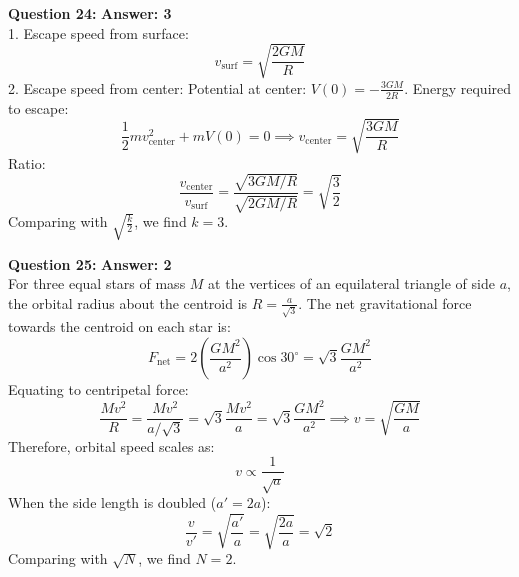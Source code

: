 \documentclass[11pt,a4paper]{article}
\begin{document}
\begin{tcolorbox}[solbox]
  \textbf{\textcolor{primaryDark}{Question 24:}} \hfill \textbf{\textcolor{l3Crimson}{Answer: 3}}\\
  \vspace{3pt}
  1. Escape speed from surface:
$$v_{\text{surf}} = \sqrt{\frac{2GM}{R}}$$
\vspace{3pt}
2. Escape speed from center:
Potential at center: $V(0) = -\frac{3GM}{2R}$.
Energy required to escape:
$$\frac{1}{2}m v_{\text{center}}^2 + m V(0) = 0 \implies v_{\text{center}} = \sqrt{\frac{3GM}{R}}$$
\vspace{3pt}
Ratio:
$$\frac{v_{\text{center}}}{v_{\text{surf}}} = \frac{\sqrt{3GM/R}}{\sqrt{2GM/R}} = \sqrt{\frac{3}{2}}$$
\vspace{3pt}
Comparing with $\sqrt{\frac{k}{2}}$, we find $k = 3$.
\end{tcolorbox}
\vspace{3pt}

\begin{tcolorbox}[solbox]
  \textbf{\textcolor{primaryDark}{Question 25:}} \hfill \textbf{\textcolor{l3Crimson}{Answer: 2}}\\
  \vspace{3pt}
  For three equal stars of mass $M$ at the vertices of an equilateral triangle of side $a$, the orbital radius about the centroid is $R = \frac{a}{\sqrt{3}}$.
\vspace{3pt}
The net gravitational force towards the centroid on each star is:
$$F_{\text{net}} = 2\left(\frac{GM^2}{a^2}\right)\cos 30^\circ = \sqrt{3}\frac{GM^2}{a^2}$$
Equating to centripetal force:
$$\frac{M v^2}{R} = \frac{M v^2}{a/\sqrt{3}} = \sqrt{3}\frac{M v^2}{a} = \sqrt{3}\frac{GM^2}{a^2} \implies v = \sqrt{\frac{GM}{a}}$$
\vspace{3pt}
Therefore, orbital speed scales as:
$$v \propto \frac{1}{\sqrt{a}}$$
When the side length is doubled ($a' = 2a$):
$$\frac{v}{v'} = \sqrt{\frac{a'}{a}} = \sqrt{\frac{2a}{a}} = \sqrt{2}$$
\vspace{3pt}
Comparing with $\sqrt{N}$, we find $N = 2$.
\end{tcolorbox}
\vspace{3pt}
\end{document}
